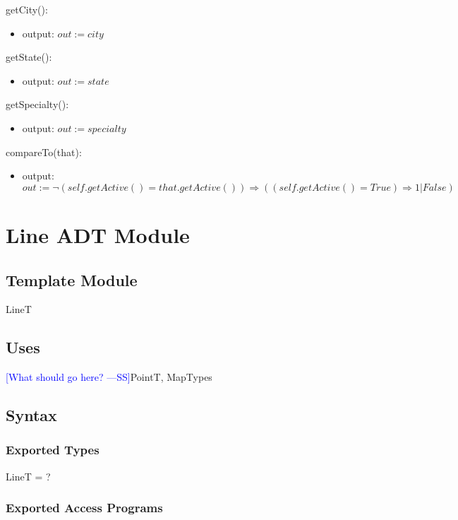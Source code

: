 \documentclass[12pt]{article}
\newcommand{\authornote}[3]{\textcolor{#1}{[#3 ---#2]}}
\newcommand{\authornote}[3]{}
\newcommand{\wss}[1]{\authornote{blue}{SS}{#1}}
\begin{document}
\noindent getCity():
\begin{itemize}
\item output: $out := city$
\end{itemize}

\noindent getState():
\begin{itemize}
\item output: $out := state$
\end{itemize}

\noindent getSpecialty():
\begin{itemize}
\item output: $out := specialty$
\end{itemize} 

\noindent compareTo(that):
\begin{itemize}
\item output: $out := \neg (self.getActive() = that.getActive()) \Rightarrow ((self.getActive() = True) \Rightarrow 1 | False) $
\end{itemize} 


\newpage

\section* {Line ADT Module}

\subsection*{Template Module}

LineT

\subsection* {Uses}

\wss{What should go here?}PointT, MapTypes

\subsection* {Syntax}

\subsubsection* {Exported Types}

LineT = ?

\subsubsection* {Exported Access Programs}
\end{document}
